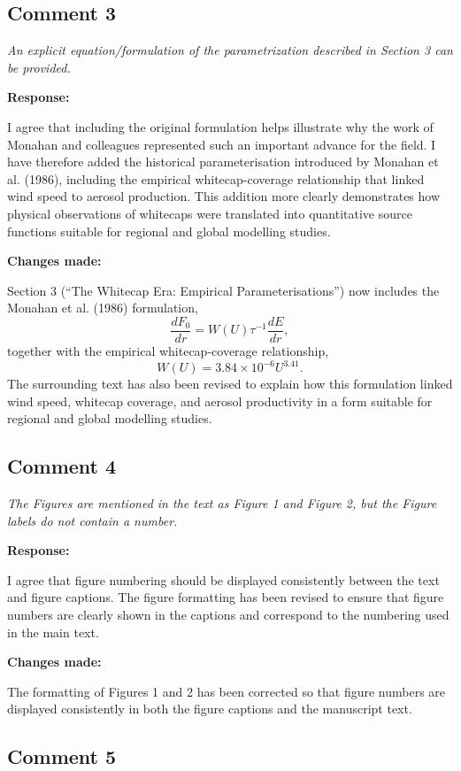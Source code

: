\documentclass[11pt]{article}
\begin{document}
\subsection*{Comment 3}

\emph{An explicit equation/formulation of the parametrization described in Section 3 can be provided.}

\textbf{Response:}

I agree that including the original formulation helps illustrate why the work of Monahan and colleagues represented such an important advance for the field. I have therefore added the historical parameterisation introduced by Monahan et al. (1986), including the empirical whitecap-coverage relationship that linked wind speed to aerosol production. This addition more clearly demonstrates how physical observations of whitecaps were translated into quantitative source functions suitable for regional and global modelling studies.

\textbf{Changes made:}

Section 3 (``The Whitecap Era: Empirical Parameterisations'') now includes the Monahan et al. (1986) formulation,
\[
\frac{dF_0}{dr}=W(U)\tau^{-1}\frac{dE}{dr},
\]
together with the empirical whitecap-coverage relationship,
\[
W(U)=3.84\times10^{-6}U^{3.41}.
\]
The surrounding text has also been revised to explain how this formulation linked wind speed, whitecap coverage, and aerosol productivity in a form suitable for regional and global modelling studies.

\subsection*{Comment 4}

\emph{The Figures are mentioned in the text as Figure 1 and Figure 2, but the Figure labels do not contain a number.}

\textbf{Response:}

I agree that figure numbering should be displayed consistently between the text and figure captions. The figure formatting has been revised to ensure that figure numbers are clearly shown in the captions and correspond to the numbering used in the main text.

\textbf{Changes made:}

The formatting of Figures 1 and 2 has been corrected so that figure numbers are displayed consistently in both the figure captions and the manuscript text.

\subsection*{Comment 5}
\end{document}
